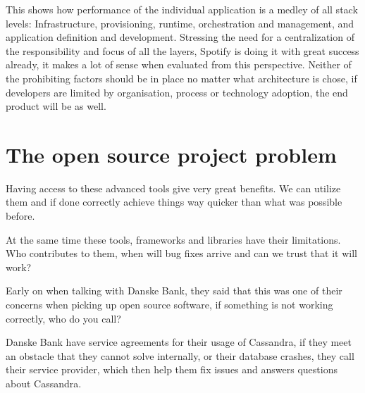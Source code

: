 This shows how performance of the individual application is a medley of all stack levels: Infrastructure, provisioning, runtime, orchestration and management, and application definition and development. Stressing the need for a centralization of the responsibility and focus of all the layers, Spotify is doing it with great success already, it makes a lot of sense when evaluated from this perspective. Neither of the prohibiting factors should be in place no matter what architecture is chose, if developers are limited by organisation, process or technology adoption, the end product will be as well.


\section{The open source project problem}
Having access to these advanced tools give very great benefits. We can utilize them and if done correctly achieve things way quicker than what was possible before.

At the same time these tools, frameworks and libraries have their limitations. Who contributes to them, when will bug fixes arrive and can we trust that it will work?

Early on when talking with Danske Bank, they said that this was one of their concerns when picking up open source software, if something is not working correctly, who do you call?

Danske Bank have service agreements for their usage of Cassandra, if they meet an obstacle that they cannot solve internally, or their database crashes, they call their service provider, which then help them fix issues and answers questions about Cassandra.